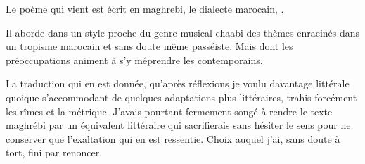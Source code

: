 \begin{prose}
  Le poème qui vient est écrit en maghrebi, le dialecte marocain, .

  Il aborde dans un style proche du genre musical chaabi  des thèmes enracinés dans un tropisme marocain et sans doute même passéiste. Mais dont les préoccupations animent à s’y méprendre les contemporains.

  La traduction qui en est donnée, qu’après réflexions je voulu davantage littérale quoique s’accommodant de quelques adaptations plus littéraires, trahis forcément les rîmes et la métrique.
  J’avais pourtant fermement songé à rendre le texte maghrébi par un équivalent littéraire qui sacrifierais sans hésiter le sens pour ne conserver que l’exaltation qui en est ressentie. Choix auquel j’ai, sans doute à tort, fini par renoncer.
\end{prose}

